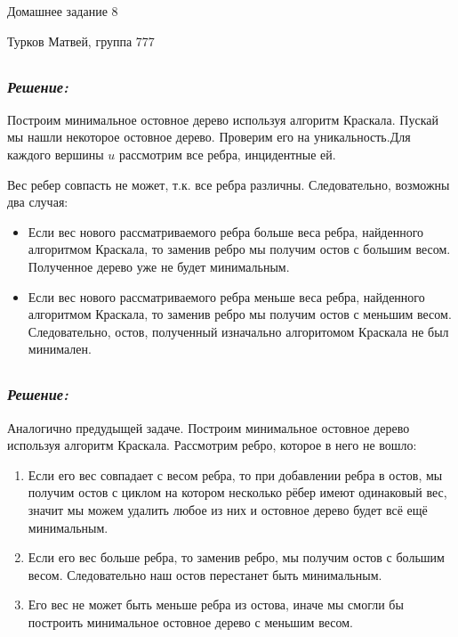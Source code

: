 \documentclass[a4paper, 12pt]{article}
\newcommand*\circled[1]{\tikz[baseline=(char.base)]{
            \node[shape=circle,draw,inner sep=2pt] (char) {#1};}}
\begin{document}
\begin{center}
  \begin{Large}
    Домашнее задание 8
  \end{Large}
\end{center}
\begin{center}
  \begin{Large}
    Турков Матвей, группа 777
  \end{Large}
\end{center}

\subsection*{\circled{1}} 
\subsubsection*{\textit{Решение:}}

Построим минимальное остовное дерево используя алгоритм Краскала. Пускай мы нашли некоторое остовное дерево. Проверим его на уникальность.Для каждого вершины $u$ рассмотрим все ребра, инцидентные ей.

Вес ребер совпасть не может, т.к. все ребра различны. Следовательно, возможны два случая:

\begin{itemize}
    \item Если вес нового рассматриваемого ребра больше веса ребра, найденного алгоритмом Краскала, то заменив ребро мы получим остов с большим весом. Полученное дерево уже не будет минимальным.
    \item Если вес нового рассматриваемого ребра меньше веса ребра, найденного алгоритмом Краскала, то заменив ребро мы получим остов с меньшим весом. Следовательно, остов, полученный изначально алгоритомом Краскала не был минимален.
\end{itemize}

\subsection*{\circled{2}} 
\subsubsection*{\textit{Решение:}}

Аналогично предудыщей задаче. Построим минимальное остовное дерево используя алгоритм Краскала. Рассмотрим ребро, которое в него не вошло:

\begin{enumerate}
    \item Если его вес совпадает с весом ребра, то при добавлении ребра в остов, мы получим остов с циклом на котором несколько рёбер имеют одинаковый вес, значит мы можем удалить любое из них и остовное дерево будет всё ещё минимальным.
    \item Если его вес больше ребра, то заменив ребро, мы получим остов с большим весом. Следовательно наш остов перестанет быть минимальным.
    \item Его вес не может быть меньше ребра из остова, иначе мы смогли бы построить минимальное остовное дерево с меньшим весом.
\end{enumerate}
\end{document}
